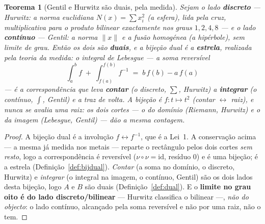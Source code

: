 \documentclass[11pt,a4paper]{article}
\newtheorem{teorema}{Teorema}
\begin{document}
\begin{teorema}[Gentil e Hurwitz são duais, pela medida]\label{thm:central}
Sejam o lado \textbf{discreto} --- \emph{Hurwitz}: a norma euclidiana $N(x)=\sum x_i^2$ (a esfera),
lida pela cruz, multiplicativa para o produto \emph{bilinear} exactamente nos graus $1,2,4,8$ --- e o
lado \textbf{contínuo} --- \emph{Gentil}: a norma $\|x\|$ e a fusão homogénea (a hipérbole), sem limite
de grau. Então os dois são \textbf{duais}, e a bijeção dual é a \textbf{estrela}, realizada pela
\emph{teoria da medida}: o integral de Lebesgue --- a soma reversível
\[
  \int_a^b f \;+\; \int_{f(a)}^{f(b)} f^{-1} \;=\; b\,f(b)-a\,f(a)
\]
--- é a correspondência que leva \textbf{contar} (o discreto, $\sum$, Hurwitz) a \textbf{integrar} (o
contínuo, $\int$, Gentil) e a traz de volta. A bijeção é $f:t\mapsto t^2$ (contar $\leftrightarrow$
raiz), e \emph{nunca se avalia uma raiz}: os dois cortes --- o do domínio (Riemann, Hurwitz) e o da
imagem (Lebesgue, Gentil) --- dão a mesma contagem.
\end{teorema}

\begin{proof}
A bijeção dual é a involução $f\leftrightarrow f^{-1}$, que é a Lei~1. A conservação acima
--- a mesma já medida nos metais --- reparte o rectângulo pelos dois cortes \emph{sem resto}, logo a
correspondência é reversível ($\nu\circ\nu=\mathrm{id}$, resíduo $0$) e é uma bijeção; é a estrela
(Definição~\ref{def:bijdual}). \emph{Contar} (a soma no domínio, o discreto, Hurwitz) e \emph{integrar}
(o integral na imagem, o contínuo, Gentil) são os dois lados desta bijeção, logo $A$ e $B$ são duais
(Definição~\ref{def:dual}). E o \textbf{limite no grau oito é do lado discreto/bilinear} --- Hurwitz
classifica o bilinear ---, \emph{não do objecto}: o lado contínuo, alcançado pela soma reversível e não
por uma raiz, não o tem.
\end{proof}
\end{document}
